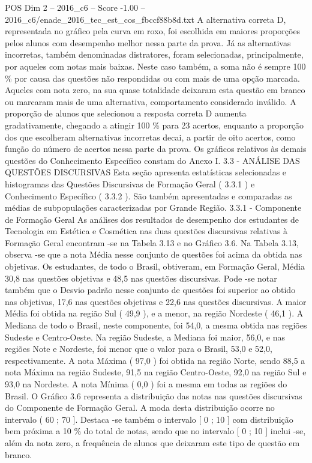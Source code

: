 \begin{textsample}{POS Dim 2 – 2016\_c6 – Score -1.00 – 2016\_c6/enade\_2016\_tec\_est\_cos\_fbccf88b8d.txt}
A alternativa correta D, representada no gráfico pela curva em roxo, foi escolhida em maiores proporções pelos alunos com desempenho melhor nessa parte da prova.
Já as alternativas incorretas, também denominadas distratores, foram selecionadas, principalmente, por aqueles com notas mais baixas.
Neste caso também, a soma não é sempre 100 \% por causa das questões não respondidas ou com mais de uma opção marcada.
Aqueles com nota zero, na sua quase totalidade deixaram esta questão em branco ou marcaram mais de uma alternativa, comportamento considerado inválido.
A proporção de alunos que selecionou a resposta correta D aumenta gradativamente, chegando a atingir 100 \% para 23 acertos, enquanto a proporção dos que escolheram alternativas incorretas decai, a partir de oito acertos, como função do número de acertos nessa parte da prova.
Os gráficos relativos às demais questões do Conhecimento Específico constam do Anexo I. 3.3 - ANÁLISE DAS QUESTÕES DISCURSIVAS Esta seção apresenta estatísticas selecionadas e histogramas das Questões Discursivas de Formação Geral ( 3.3.1 ) e Conhecimento Específico ( 3.3.2 ).
São também apresentadas e comparadas as médias de subpopulações caracterizadas por Grande Região. 3.3.1 - Componente de Formação Geral As análises dos resultados de desempenho dos estudantes de Tecnologia em Estética e Cosmética nas duas questões discursivas relativas à Formação Geral encontram -se na Tabela 3.13 e no Gráfico 3.6.
Na Tabela 3.13, observa -se que a nota Média nesse conjunto de questões foi acima da obtida nas objetivas.
Os estudantes, de todo o Brasil, obtiveram, em Formação Geral, Média 30,8 nas questões objetivas e 48,5 nas questões discursivas.
Pode -se notar também que o Desvio padrão nesse conjunto de questões foi superior ao obtido nas objetivas, 17,6 nas questões objetivas e 22,6 nas questões discursivas.
A maior Média foi obtida na região Sul ( 49,9 ), e a menor, na região Nordeste ( 46,1 ).
A Mediana de todo o Brasil, neste componente, foi 54,0, a mesma obtida nas regiões Sudeste e Centro-Oeste.
Na região Sudeste, a Mediana foi maior, 56,0, e nas regiões Note e Nordeste, foi menor que o valor para o Brasil, 53,0 e 52,0, respectivamente.
A nota Máxima ( 97,0 ) foi obtida na região Norte, sendo 88,5 a nota Máxima na região Sudeste, 91,5 na região Centro-Oeste, 92,0 na região Sul e 93,0 na Nordeste.
A nota Mínima ( 0,0 ) foi a mesma em todas as regiões do Brasil.
O Gráfico 3.6 representa a distribuição das notas nas questões discursivas do Componente de Formação Geral.
A moda desta distribuição ocorre no intervalo ( 60 ; 70 ].
Destaca -se também o intervalo [ 0 ; 10 ] com distribuição bem próxima a 10 \% do total de notas, sendo que no intervalo [ 0 ; 10 ] inclui -se, além da nota zero, a frequência de alunos que deixaram este tipo de questão em branco.

\end{textsample}
